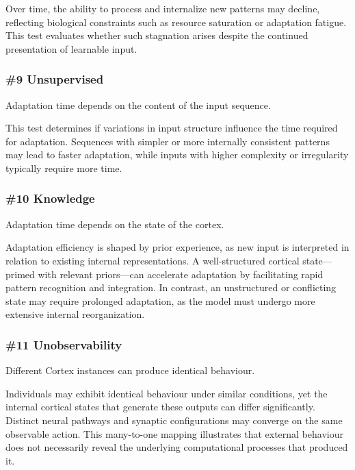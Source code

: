 \documentclass{article}
\newenvironment{one_assertion}[1]
{
  \begin{tabular}{p{1.5cm}p{8.2cm}}
    \textbf{Assertion:} & #1 \\
}{
  \end{tabular}\\
}
\begin{document}
Over time, the ability to process and internalize new patterns may decline, reflecting biological constraints such as resource saturation or adaptation fatigue. This test evaluates whether such stagnation arises despite the continued presentation of learnable input.

\subsubsection*{\#9 Unsupervised}
\begin{one_assertion}
    {Adaptation time depends on the content of the input sequence.}
\end{one_assertion}

This test determines if variations in input structure influence the time required for adaptation. Sequences with simpler or more internally consistent patterns may lead to faster adaptation, while inputs with higher complexity or irregularity typically require more time. 

\subsubsection*{\#10 Knowledge}
\begin{one_assertion}
{Adaptation time depends on the state of the cortex.}
\end{one_assertion}

Adaptation efficiency is shaped by prior experience, as new input is interpreted in relation to existing internal representations. A well-structured cortical state—primed with relevant priors—can accelerate adaptation by facilitating rapid pattern recognition and integration. In contrast, an unstructured or conflicting state may require prolonged adaptation, as the model must undergo more extensive internal reorganization.

\subsubsection*{\#11 Unobservability}
\begin{one_assertion}
    {Different Cortex instances can produce identical behaviour.}
\end{one_assertion}

Individuals may exhibit identical behaviour under similar conditions, yet the internal cortical states that generate these outputs can differ significantly. Distinct neural pathways and synaptic configurations may converge on the same observable action. This many-to-one mapping illustrates that external behaviour does not necessarily reveal the underlying computational processes that produced it.
\end{document}
